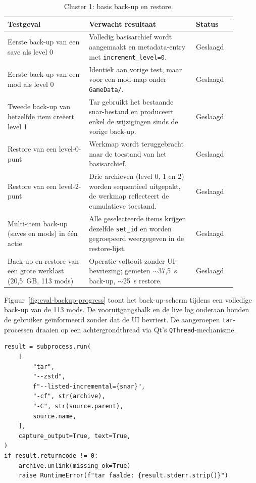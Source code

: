 \begin{table}[h]
    \centering
    \small
    \begin{tabular}{p{0.32\linewidth}p{0.42\linewidth}p{0.16\linewidth}}
        \toprule
        \textbf{Testgeval} & \textbf{Verwacht resultaat} & \textbf{Status} \\
        \midrule
        Eerste back-up van een save als level 0 & Volledig basisarchief wordt aangemaakt en metadata-entry met \texttt{increment\_level=0}. & Geslaagd \\
        Eerste back-up van een mod als level 0 & Identiek aan vorige test, maar voor een mod-map onder \texttt{GameData/}. & Geslaagd \\
        Tweede back-up van hetzelfde item creëert level 1 & Tar gebruikt het bestaande snar-bestand en produceert enkel de wijzigingen sinds de vorige back-up. & Geslaagd \\
        Restore van een level-0-punt & Werkmap wordt teruggebracht naar de toestand van het basisarchief. & Geslaagd \\
        Restore van een level-2-punt & Drie archieven (level 0, 1 en 2) worden sequentieel uitgepakt, de werkmap reflecteert de cumulatieve toestand. & Geslaagd \\
        Multi-item back-up (saves en mods) in één actie & Alle geselecteerde items krijgen dezelfde \texttt{set\_id} en worden gegroepeerd weergegeven in de restore-lijst. & Geslaagd \\
        Back-up en restore van een grote werklast (20{,}5~GB, 113 mods) & Operatie voltooit zonder UI-bevriezing; gemeten $\sim$37{,}5~s back-up, $\sim$25~s restore. & Geslaagd \\
        \bottomrule
    \end{tabular}
    \caption{Cluster 1: basis back-up en restore.}
    \label{tab:eval-cluster1}
\end{table}

Figuur~\ref{fig:eval-backup-progress} toont het back-up-scherm tijdens een volledige back-up van de 113 mods. De vooruitgangsbalk en de live log onderaan houden de gebruiker geïnformeerd zonder dat de UI bevriest. De aangeroepen \texttt{tar}-processen draaien op een achtergrondthread via Qt's \texttt{QThread}-mechanisme.

\begin{listing}[h]
\begin{verbatim}
result = subprocess.run(
    [
        "tar",
        "--zstd",
        f"--listed-incremental={snar}",
        "-cf", str(archive),
        "-C", str(source.parent),
        source.name,
    ],
    capture_output=True, text=True,
)
if result.returncode != 0:
    archive.unlink(missing_ok=True)
    raise RuntimeError(f"tar faalde: {result.stderr.strip()}")
\end{verbatim}
\caption{Back-upoproep in \texttt{backup.py}: de \texttt{tar}-opdracht met \texttt{--listed-incremental} en \texttt{--zstd} wordt via \texttt{subprocess.run} aangeroepen. Het snar-bestand bepaalt welke bestanden als gewijzigd worden beschouwd, bij een terugkerende foutcode wordt het onvolledig archief onmiddellijk verwijderd.}
\label{lst:poc-backup-call}
\end{listing}

